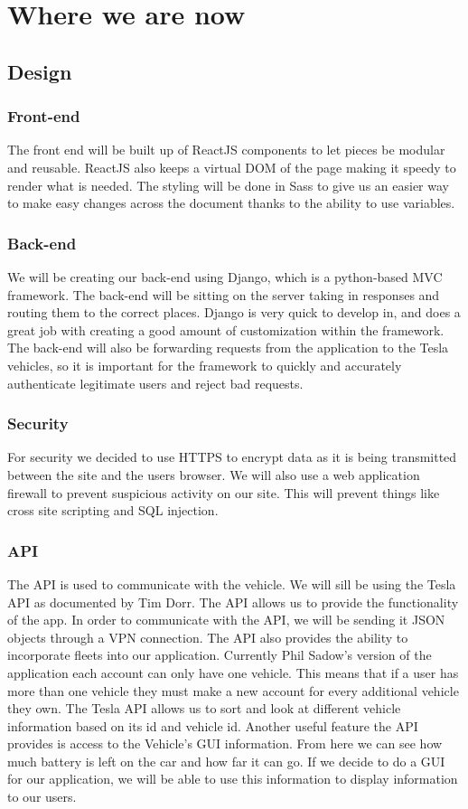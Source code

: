 \documentclass[onecolumn, draftclsnofoot,10pt, compsoc]{IEEEtran}
\begin{document}
\section{Where we are now}
    \subsection{Design}
        \subsubsection{Front-end}
            The front end will be built up of ReactJS components to let pieces be modular and reusable. ReactJS also keeps a virtual DOM of the page making it speedy to render what is needed. The styling will be done in Sass to give us an easier way to make easy changes across the document thanks to the ability to use variables.
        \subsubsection{Back-end}
            We will be creating our back-end using Django, which is a python-based MVC framework. The back-end will be sitting on the server taking in responses and routing them to the correct places. Django is very quick to develop in, and does a great job with creating a good amount of customization within the framework. The back-end will also be forwarding requests from the application to the Tesla vehicles, so it is important for the framework to quickly and accurately authenticate legitimate users and reject bad requests.  
        \subsubsection{Security}
            For security we decided to use HTTPS to encrypt data as it is being transmitted between the site and the users browser. We will also use a web application firewall to prevent suspicious activity on our site. This will prevent things like cross site scripting and SQL injection.
        \subsubsection{API}
            The API is used to communicate with the vehicle. We will sill be using the Tesla API as documented by Tim Dorr. The API allows us to provide the functionality of the app. In order to communicate with the API, we will be sending it JSON objects through a VPN connection. The API also provides the ability to incorporate fleets into our application. Currently Phil Sadow's version of the application each account can only have one vehicle. This means that if a user has more than one vehicle they must make a new account for every additional vehicle they own. The Tesla API allows us to sort and look at different vehicle information based on its id and vehicle id. Another useful feature the API provides is access to the Vehicle's GUI information. From here we can see how much battery is left on the car and how far it can go. If we decide to do a GUI for our application, we will be able to use this information to display information to our users.
\end{document}
